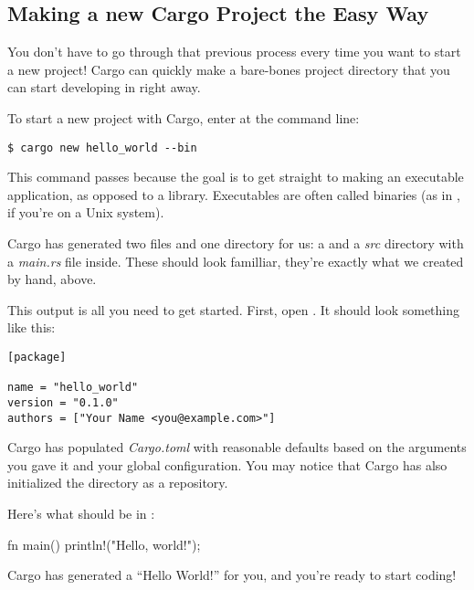 \subsection*{Making a new Cargo Project the Easy Way}

You don't have to go through that previous process every time you want to start a new project! Cargo can quickly make a 
bare-bones project directory that you can start developing in right away.

\blank

To start a new project with Cargo, enter  at the command line:

\begin{verbatim}
$ cargo new hello_world --bin
\end{verbatim}

This command passes  because the goal is to get straight to making an executable application, as opposed to a 
library. Executables are often called binaries (as in , if you're on a Unix system).

\blank

Cargo has generated two files and one directory for us: a  and a \emph{src} directory with a \emph{main.rs}
file inside. These should look familliar, they're exactly what we created by hand, above.

\blank

This output is all you need to get started. First, open . It should look something like this:

\begin{verbatim}
[package]

name = "hello_world"
version = "0.1.0"
authors = ["Your Name <you@example.com>"]  
\end{verbatim}

Cargo has populated \emph{Cargo.toml} with reasonable defaults based on the arguments you gave it and your 
global configuration. You may notice that Cargo has also initialized the  directory as a  
repository.

\blank

Here's what should be in :

\begin{rustc}
fn main() {
    println!("Hello, world!");
}
\end{rustc}

Cargo has generated a \enquote{Hello World!} for you, and you're ready to start coding!

